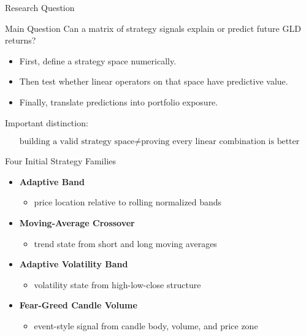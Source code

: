 \documentclass[aspectratio=169]{beamer}
\begin{document}
\begin{frame}{Research Question}
  \begin{block}{Main Question}
    Can a matrix of strategy signals explain or predict future GLD returns?
  \end{block}

  \vspace{0.6em}
  \begin{itemize}
    \item First, define a strategy space numerically.
    \item Then test whether linear operators on that space have predictive value.
    \item Finally, translate predictions into portfolio exposure.
  \end{itemize}

  \vspace{0.5em}
  Important distinction:

  \[
    \text{building a valid strategy space}
    \neq
    \text{proving every linear combination is better}
  \]
\end{frame}

\begin{frame}{Four Initial Strategy Families}
  \begin{itemize}
    \item \textbf{Adaptive Band}
    \begin{itemize}
      \item price location relative to rolling normalized bands
    \end{itemize}
    \item \textbf{Moving-Average Crossover}
    \begin{itemize}
      \item trend state from short and long moving averages
    \end{itemize}
    \item \textbf{Adaptive Volatility Band}
    \begin{itemize}
      \item volatility state from high-low-close structure
    \end{itemize}
    \item \textbf{Fear-Greed Candle Volume}
    \begin{itemize}
      \item event-style signal from candle body, volume, and price zone
    \end{itemize}
  \end{itemize}
\end{frame}
\end{document}
